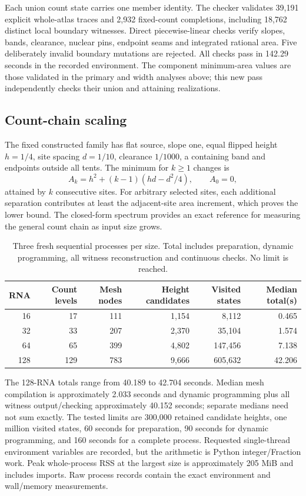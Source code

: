 \documentclass[10pt,letterpaper]{article}
\begin{document}
Each union count state carries one member identity. The checker validates 39,191 explicit whole-atlas traces and 2,932 fixed-count completions, including 18,762 distinct local boundary witnesses. Direct piecewise-linear checks verify slopes, bands, clearance, nuclear pins, endpoint seams and integrated rational area. Five deliberately invalid boundary mutations are rejected. All checks pass in 142.29 seconds in the recorded environment. The component minimum-area values are those validated in the primary and width analyses above; this new pass independently checks their union and attaining realizations.

\subsection{Count-chain scaling}
The fixed constructed family has flat source, slope one, equal flipped height $h=1/4$, site spacing $d=1/10$, clearance $1/1000$, a containing band and endpoints outside all tents. The minimum for $k\ge1$ changes is
\[
 A_k=h^2+(k-1)(hd-d^2/4),\qquad A_0=0,
\]
attained by $k$ consecutive sites. For arbitrary selected sites, each additional separation contributes at least the adjacent-site area increment, which proves the lower bound. The closed-form spectrum provides an exact reference for measuring the general count chain as input size grows.

\begin{table}[ht]\centering
\begin{tabular}{rrrrrr}\toprule
RNA&Count levels&Mesh nodes&Height candidates&Visited states&Median total(s)\\\midrule
16&17&111&1,154&8,112&0.465\\
32&33&207&2,370&35,104&1.574\\
64&65&399&4,802&147,456&7.138\\
128&129&783&9,666&605,632&42.206\\\bottomrule
\end{tabular}
\caption{Three fresh sequential processes per size. Total includes preparation, dynamic programming, all witness reconstruction and continuous checks. No limit is reached.}
\end{table}

The 128-RNA totals range from 40.189 to 42.704 seconds. Median mesh compilation is approximately 2.033 seconds and dynamic programming plus all witness output/checking approximately 40.152 seconds; separate medians need not sum exactly. The tested limits are 300,000 retained candidate heights, one million visited states, 60 seconds for preparation, 90 seconds for dynamic programming, and 160 seconds for a complete process. Requested single-thread environment variables are recorded, but the arithmetic is Python integer/Fraction work. Peak whole-process RSS at the largest size is approximately 205 MiB and includes imports. Raw process records contain the exact environment and wall/memory measurements.
\end{document}
